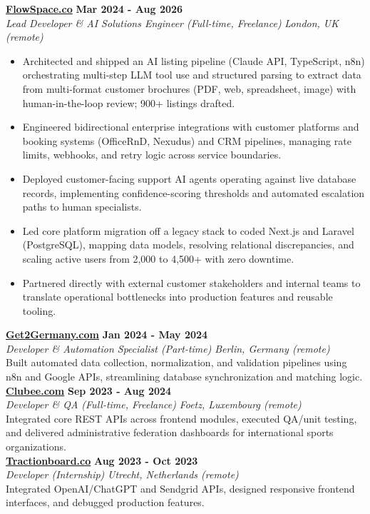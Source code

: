 \documentclass[a4paper,10pt]{article}
\newcommand{\role}[4]{%
  \textbf{#1} \hfill \textbf{#2}\\[1pt]%
  \textit{#3} \hfill \textit{#4}\\[2pt]%
}
\begin{document}
\role{\href{https://flowspace.co}{FlowSpace.co}}{Mar 2024 - Aug 2026}{Lead Developer \& AI Solutions Engineer (Full-time, Freelance)}{London, UK (remote)}
\begin{itemize}
  \item Architected and shipped an AI listing pipeline (Claude API, TypeScript, n8n) orchestrating multi-step LLM tool use and structured parsing to extract data from multi-format customer brochures (PDF, web, spreadsheet, image) with human-in-the-loop review; 900+ listings drafted.
  \item Engineered bidirectional enterprise integrations with customer platforms and booking systems (OfficeRnD, Nexudus) and CRM pipelines, managing rate limits, webhooks, and retry logic across service boundaries.
  \item Deployed customer-facing support AI agents operating against live database records, implementing confidence-scoring thresholds and automated escalation paths to human specialists.
  \item Led core platform migration off a legacy stack to coded Next.js and Laravel (PostgreSQL), mapping data models, resolving relational discrepancies, and scaling active users from 2,000 to 4,500+ with zero downtime.
  \item Partnered directly with external customer stakeholders and internal teams to translate operational bottlenecks into production features and reusable tooling.
\end{itemize}

\role{\href{https://get2germany.com}{Get2Germany.com}}{Jan 2024 - May 2024}{Developer \& Automation Specialist (Part-time)}{Berlin, Germany (remote)}
Built automated data collection, normalization, and validation pipelines using n8n and Google APIs, streamlining database synchronization and matching logic.\\[1pt]

\role{\href{https://clubee.com}{Clubee.com}}{Sep 2023 - Aug 2024}{Developer \& QA (Full-time, Freelance)}{Foetz, Luxembourg (remote)}
Integrated core REST APIs across frontend modules, executed QA/unit testing, and delivered administrative federation dashboards for international sports organizations.\\[1pt]

\role{\href{https://tractionboard.co}{Tractionboard.co}}{Aug 2023 - Oct 2023}{Developer (Internship)}{Utrecht, Netherlands (remote)}
Integrated OpenAI/ChatGPT and Sendgrid APIs, designed responsive frontend interfaces, and debugged production features.
\end{document}
